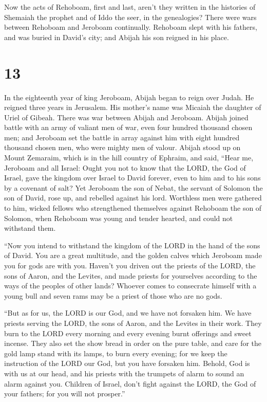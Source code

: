  Now the acts of Rehoboam, first and last, aren't they
written in the histories of Shemaiah the prophet and of Iddo the seer,
in the genealogies? There were wars between Rehoboam and Jeroboam
continually.  Rehoboam slept with his fathers, and was
buried in David's city; and Abijah his son reigned in his place.

\hypertarget{section-12}{%
\section{13}\label{section-12}}

 In the eighteenth year of king Jeroboam, Abijah began to
reign over Judah.  He reigned three years in Jerusalem.
His mother's name was Micaiah the daughter of Uriel of Gibeah. There was
war between Abijah and Jeroboam.  Abijah joined battle
with an army of valiant men of war, even four hundred thousand chosen
men; and Jeroboam set the battle in array against him with eight hundred
thousand chosen men, who were mighty men of valour. 
Abijah stood up on Mount Zemaraim, which is in the hill country of
Ephraim, and said, ``Hear me, Jeroboam and all Israel: 
Ought you not to know that the LORD, the God of Israel, gave the kingdom
over Israel to David forever, even to him and to his sons by a covenant
of salt?  Yet Jeroboam the son of Nebat, the servant of
Solomon the son of David, rose up, and rebelled against his lord.
 Worthless men were gathered to him, wicked fellows who
strengthened themselves against Rehoboam the son of Solomon, when
Rehoboam was young and tender hearted, and could not withstand them.

 ``Now you intend to withstand the kingdom of the LORD in
the hand of the sons of David. You are a great multitude, and the golden
calves which Jeroboam made you for gods are with you. 
Haven't you driven out the priests of the LORD, the sons of Aaron, and
the Levites, and made priests for yourselves according to the ways of
the peoples of other lands? Whoever comes to consecrate himself with a
young bull and seven rams may be a priest of those who are no gods.

 ``But as for us, the LORD is our God, and we have not
forsaken him. We have priests serving the LORD, the sons of Aaron, and
the Levites in their work.  They burn to the LORD every
morning and every evening burnt offerings and sweet incense. They also
set the show bread in order on the pure table, and care for the gold
lamp stand with its lamps, to burn every evening; for we keep the
instruction of the LORD our God, but you have forsaken him.
 Behold, God is with us at our head, and his priests with
the trumpets of alarm to sound an alarm against you. Children of Israel,
don't fight against the LORD, the God of your fathers; for you will not
prosper.''

